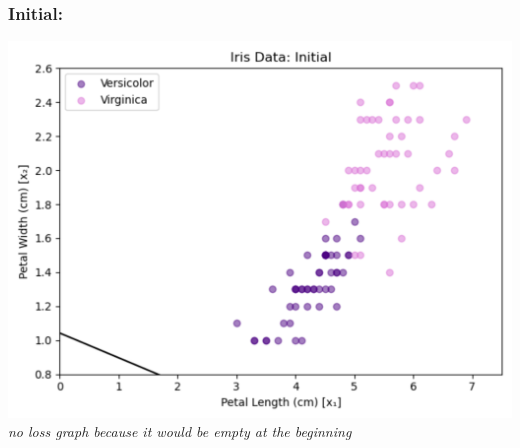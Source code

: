 \documentclass{article} %
\begin{document}
\subsubsection*{Initial: }
\begin{center}
    \includegraphics[scale = 0.35]{3c_plot_initial_db.png} \textit{no loss graph because it would be empty at the beginning}
\end{center}
\end{document}
